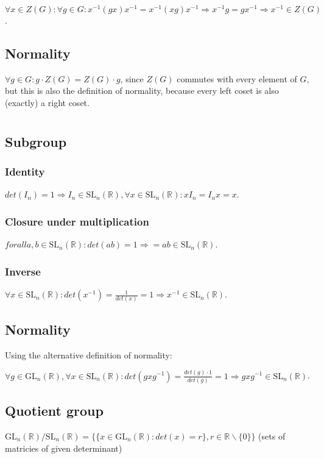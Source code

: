 \documentclass[a4paper]{article}
\begin{document}
$\forall x \in Z(G): \forall g \in G: x^{-1}(gx)x^{-1} = x^{-1}(xg)x^{-1} \Rightarrow x^{-1}g = gx^{-1} \Rightarrow x^{-1} \in Z(G)$.


\subsection*{Normality}

$\forall g\in G: g\cdot Z(G) = Z(G) \cdot g$, since $Z(G)$ commutes with every element of $G$, but this is also the definition of normality, because every left coset is also (exactly) a right coset.

\section{}

\subsection*{Subgroup}

\newcommand{\sln}{\text{SL}_n(\mathbb{R})}
\newcommand{\gln}{\text{GL}_n(\mathbb{R})}

\subsubsection*{Identity}

$det(I_n) = 1 \Rightarrow I_n \in \sln, \forall x \in \sln: xI_n = I_nx = x$.

\subsubsection*{Closure under multiplication}
$forall a, b \in \sln: det(ab) = 1 \Rightarrow = ab \in \sln$.

\subsubsection*{Inverse}

$\forall x \in \sln: det(x^{-1}) = \frac{1}{det(x)} = 1 \Rightarrow x^{-1} \in \sln$.

\subsection*{Normality}

Using the alternative definition of normality:

$\forall g \in \gln, \forall x \in \sln: det(gxg^{-1}) = \frac{det(g)\cdot 1}{det(g)} = 1 \Rightarrow gxg^{-1} \in \sln$.

\subsection*{Quotient group}

$\gln/\sln = \{\{ x \in \gln: det(x) = r\}, r \in \mathbb{R} \backslash \{0\}\}$ (sets of matricies of given determinant)	
\end{document}
